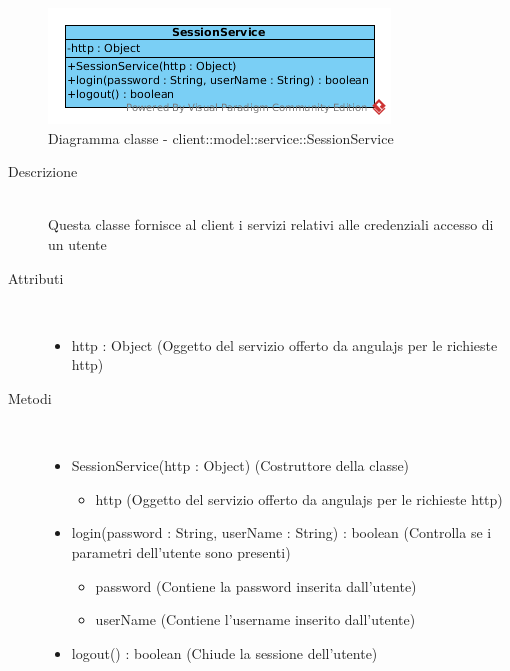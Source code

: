 \begin{center}
			\begin{figure}[H]
				\centering \includegraphics[scale=4, max width=\textwidth, max height=\myheight]{../img/diagrammiClassi/client/model/service/SessionService.png}
				\caption{Diagramma classe - client::model::service::SessionService}
			\end{figure}
		\end{center}\begin{description}
\item[Descrizione] \hfill \\
 Questa classe fornisce al client i servizi relativi  alle credenziali accesso di un utente
\item[Attributi] \hfill \\
 \vspace{-7mm}
\begin{itemize}
\item http : Object (Oggetto del servizio offerto da angulajs per le richieste http)
\end{itemize}

\item[Metodi] \hfill \\
 \vspace{-7mm}
\begin{itemize}
\item SessionService(http : Object) (Costruttore della classe)\begin{itemize}
\item http (Oggetto del servizio offerto da angulajs per le richieste http)
\end{itemize}

\item login(password : String, userName : String) : boolean (Controlla se i parametri dell'utente sono presenti)\begin{itemize}
\item password (Contiene la password inserita dall'utente)
\item userName (Contiene l'username inserito dall'utente)
\end{itemize}

\item logout() : boolean (Chiude la sessione dell'utente)
\end{itemize}

\end{description}

